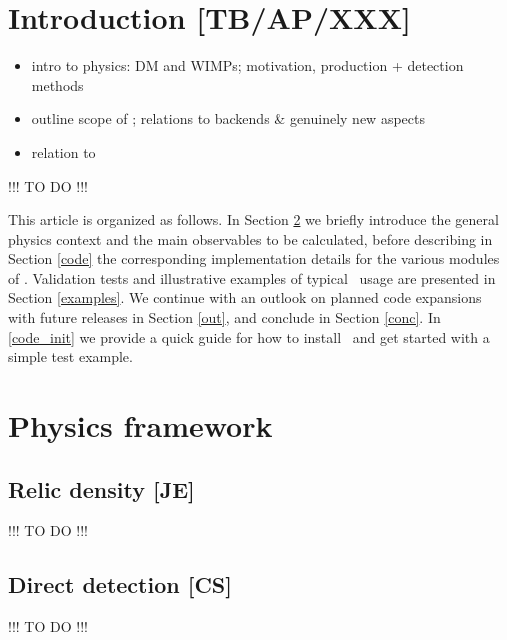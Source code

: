 \section{Introduction [TB/AP/XXX]}
\label{intro}

\begin{itemize}
\item intro to physics: DM and WIMPs; motivation, production + detection methods
\item outline scope of \DB; relations to backends \& genuinely new aspects
\item relation to \GB
\end{itemize}

\smallskip
{\color{red} !!! TO DO !!!}
\smallskip


This article is organized as follows. In Section \ref{phys} we  briefly introduce the general physics 
context and the main  observables to be calculated, before describing in Section \ref{code} the corresponding 
implementation details for the various modules of \DB. Validation tests and illustrative examples of typical
\DB\ usage are presented in Section \ref{examples}. We continue with an outlook on planned code expansions 
with future releases in Section \ref{out}, and conclude in Section \ref{conc}. In \ref{code_init} we provide a quick 
guide for how to install \DB\ and get started with a simple test example.

\section{Physics framework}
\label{phys}


\subsection{Relic density {\bf [JE]}}
\label{phys_rd}
\smallskip
{\color{red} !!! TO DO !!!}
\smallskip

\subsection{Direct detection {\bf [CS]}}
\label{phys_dd}
\smallskip
{\color{red} !!! TO DO !!!}
\smallskip



